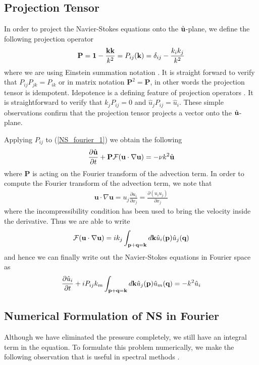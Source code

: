 \subsection{Projection Tensor}
In order to project the Navier-Stokes equations onto the $\hat{\textbf{u}}$-plane, we define the following projection operator
\begin{align}
\textbf{P}=\textbf{1} - \frac{\textbf{k}\textbf{k}}{k^{2}} = P_{ij}(\textbf{k}) = \delta_{ij} - \frac{k_{i}k_{j}}{k^{2}}
\end{align}
where we are using Einstein summation notation \cite{lesieur,wald}. It is straight forward to verify that $P_{ij}P_{jk}=P_{ik}$ or in matrix notation $\textbf{P}^{2}=\textbf{P}$, in other words the projection tensor is idempotent. Idepotence is a defining feature of projection operators \cite{MeyerLinAlg}. It is straightforward to verify that $k_{j}P_{ij}=0$ and $\hat{u}_{j}P_{ij}=\hat{u}_{i}$. These simple observations confirm that the projection tensor projects a vector onto the $\hat{\textbf{u}}$-plane. 

Applying $P_{ij}$ to (\ref{NS_fourier_1}) we obtain the following 
\begin{align}
\frac{\partial \hat{\textbf{u}}}{\partial t} + \textbf{P}\mathcal{F}(\textbf{u}\cdot\nabla\textbf{u}) =  -\nu k^{2}\hat{\textbf{u}}\label{NS_fourier_2}
\end{align}
where $\textbf{P}$ is acting on the Fourier transform of the advection term. In order to compute the Fourier transform of the advection term, we note that 
\begin{align}
\textbf{u}\cdot\nabla\textbf{u} = u_{j}\frac{\partial u_{i}}{\partial x_{j}} = \frac{\partial (u_{i}u_{j})}{\partial x_{j}}
\end{align}
where the incompressibility condition has been used to bring the velocity inside the derivative. Thus we are able to write
\begin{align}
\mathcal{F}(\textbf{u}\cdot\nabla\textbf{u})=ik_{j}\int_{\textbf{p}+\textbf{q}=\textbf{k}}d\textbf{k}\hat{u}_{i}(\textbf{p})\hat{u}_{j}(\textbf{q})
\end{align}
and hence we can finally write out the Navier-Stokes equations in Fourier space as \cite{lesieur}
\begin{align}
\frac{\partial \hat{u}_{i}}{\partial t} + iP_{ij}k_{m}\int_{\textbf{p}+\textbf{q}=\textbf{k}}d\textbf{k}\hat{u}_{j}(\textbf{p})\hat{u}_{m}(\textbf{q})=  -k^{2}\hat{u}_{i}\label{NS_fourier_3}
\end{align}

\subsection{Numerical Formulation of NS in Fourier}
Although we have eliminated the pressure completely, we still have an integral term in the equation. To formulate this problem numerically, we make the following observation that is useful in spectral methods \cite{lesieur,orszag1972}.

